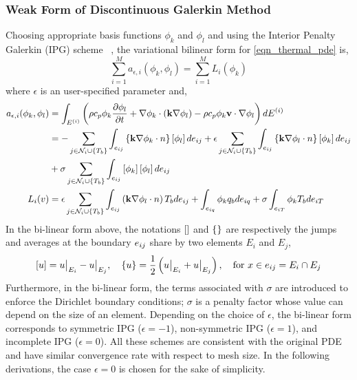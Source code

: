 \subsubsection{Weak Form of Discontinuous Galerkin Method}

Choosing appropriate basis functions $\phi_k$ and $\phi_l$ and using the Interior Penalty Galerkin (IPG) scheme ~\cite{Cohen and pernet 2018}, the variational bilinear form for \cref{eqn_thermal_pde} is,
\begin{equation}
    \sum_{i=1}^{M}a_{\epsilon,i}(\phi_k,\phi_l) = \sum_{i=1}^{M}L_i(\phi_k)
\end{equation}
where $\epsilon$ is an user-specified parameter and,
\begin{subequations}
    \begin{align}
        a_{\epsilon,i}(\phi_k,\phi_l) &= \int_{E^{(i)}}\left(\rho c_p \phi_k \frac{\partial \phi_l}{\partial t} + \nabla \phi_k\cdot\left(\mathbf{k}\nabla \phi_l\right) - \rho c_p \phi_k \mathbf{v}\cdot\nabla\phi_l\right)dE^{(i)}\\
        &= -\sum_{j\in\mathcal{N}_i\cup\left\{T_b\right\}}\int_{e_{ij}}\left\{\mathbf{k}\nabla\phi_k\cdot n\right\}\left[\phi_l\right]de_{ij} + \epsilon\sum_{j\in\mathcal{N}_i\cup\left\{T_b\right\}}\int_{e_{ij}}\left\{\mathbf{k}\nabla\phi_l\cdot n\right\}\left[\phi_k\right]de_{ij} \notag\\
        &+ \sigma\sum_{j\in\mathcal{N}_i\cup\left\{T_b\right\}}\int_{e_{ij}}\left[\phi_k\right]\left[\phi_l\right]de_{ij}\\
        L_i(v) &= \epsilon\sum_{j\in\mathcal{N}_i\cup\left\{T_b\right\}}\int_{e_{ij}}\left(\mathbf{k}\nabla\phi_l\cdot n\right)T_b de_{ij} + \int_{e_{iq}}\phi_k q_b de_{iq} + \sigma\int_{e_{iT}}\phi_k T_b de_{iT}
    \end{align}
\end{subequations}
In the bi-linear form above, the notations $\left[\right]$ and $\left\{\right\}$ are respectively the jumps and averages at the boundary $e_{ij}$ share by two elements $E_i$ and $E_j$,
\[
    \left[u\right] = u\big|_{E_i} - u\big|_{E_j},\quad \left\{u\right\} = \frac{1}{2}\left(u\big|_{E_i} + u\big|_{E_j}\right), \quad \text{for } x\in e_{ij} = E_i\cap E_j
\]
Furthermore, in the bi-linear form, the terms associated with $\sigma$ are introduced to enforce the Dirichlet boundary conditions; $\sigma$ is a penalty factor whose value can depend on the size of an element. Depending on the choice of $\epsilon$, the bi-linear form corresponds to symmetric IPG ($\epsilon=-1$), non-symmetric IPG ($\epsilon=1$), and incomplete IPG ($\epsilon=0$). All these schemes are consistent with the original PDE and have similar convergence rate with respect to mesh size. In the following derivations, the case $\epsilon=0$ is chosen for the sake of simplicity.

